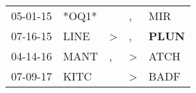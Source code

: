 \begin{supertabular}{p{0.07\textwidth}p{0.06\textwidth}p{0.02\textwidth}p{0.02\textwidth}p{0.06\textwidth}}
 05-01-15\textsuperscript{} &                   *OQ1* &               &             , &            MIR\textsuperscript{} \\
 07-16-15\textsuperscript{} &  LINE\textsuperscript{} &  \textgreater &             , &  \textbf{PLUN\textsuperscript{}} \\
 04-14-16\textsuperscript{} &  MANT\textsuperscript{} &             , &  \textgreater &           ATCH\textsuperscript{} \\
 07-09-17\textsuperscript{} &  KITC\textsuperscript{} &               &  \textgreater &           BADF\textsuperscript{} \\
\end{supertabular}
